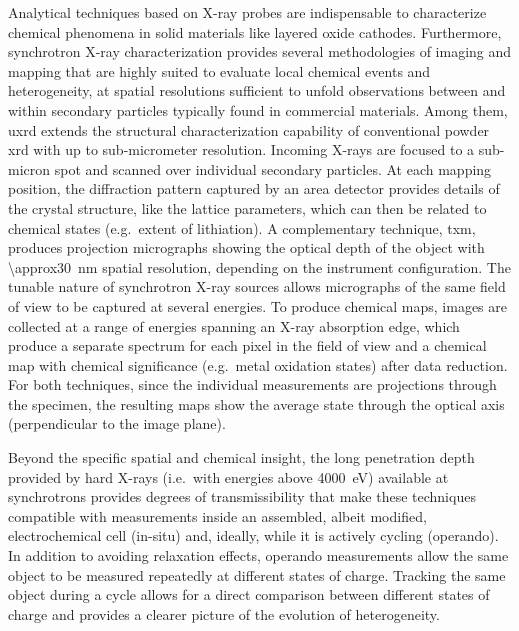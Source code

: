 \documentclass{article}
\begin{document}
Analytical techniques based on X-ray probes are indispensable to
characterize chemical phenomena in solid materials like layered oxide
cathodes\cite{doeff2017}. Furthermore, synchrotron X-ray
characterization provides several methodologies of imaging and mapping
that are highly suited to evaluate local chemical events and
heterogeneity\cite{wolf2017}, at spatial resolutions sufficient to
unfold observations between and within secondary particles typically
found in commercial materials. Among them, \gls{uxrd} extends the
structural characterization capability of conventional powder
\gls{xrd} with up to sub-micrometer resolution. Incoming X-rays are
focused to a sub-micron spot and scanned over individual secondary
particles. At each mapping position, the diffraction pattern captured
by an area detector provides details of the crystal structure, like
the lattice parameters, which can then be related to chemical states
(e.g.\ extent of lithiation). A complementary technique, \Gls{txm},
produces projection micrographs showing the optical depth of the
object with \SI{\approx30}{nm} spatial resolution, depending on the
instrument configuration. The tunable nature of synchrotron X-ray
sources allows micrographs of the same field of view to be captured at
several energies. To produce chemical maps, images are collected at a
range of energies spanning an X-ray absorption edge, which produce a
separate spectrum for each pixel in the field of view and a chemical
map with chemical significance (e.g.\ metal oxidation states) after
data reduction. For both techniques, since the individual measurements
are projections through the specimen, the resulting maps show the
average state through the optical axis (perpendicular to the image
plane).

Beyond the specific spatial and chemical insight, the long penetration
depth provided by hard X-rays (i.e.\ with energies above
\SI{4000}{\electronvolt}) available at synchrotrons provides degrees
of transmissibility that make these techniques compatible with
measurements inside an assembled, albeit modified, electrochemical
cell (in-situ) and, ideally, while it is actively cycling
(operando). In addition to avoiding relaxation effects, operando
measurements allow the same object to be measured repeatedly at
different states of charge. Tracking the same object during a cycle
allows for a direct comparison between different states of charge and
provides a clearer picture of the evolution of heterogeneity.

\end{document}
